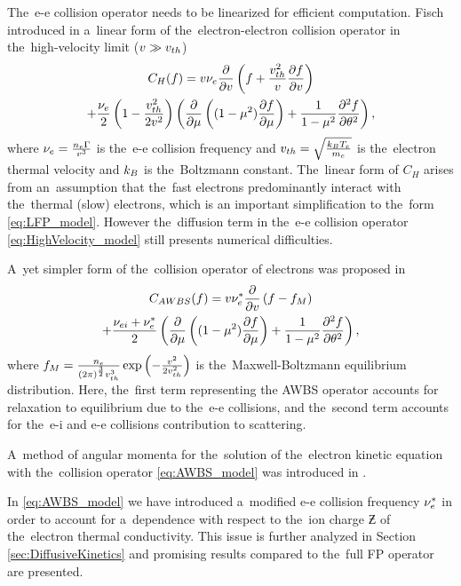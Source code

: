 The~e-e collision operator needs to be linearized for efficient computation.
Fisch introduced in \cite{Fisch_RMP1987} a~linear form of 
the~electron-electron collision operator  
in the~high-velocity limit ($v\gg v_{th}$)
\begin{multline}
  C_{H}(f) = v \nu_{e} \frac{\partial{}}{\partial{v}}\left(f + 
  \frac{v_{th}^2}{v}\frac{\partial{f}}{\partial{v}}\right) \\
  + \frac{\nu_{e}}{2}\left( 1 - \frac{v_{th}^2}{2v^2}\right) 
  \left(\frac{\partial{}}{\partial{\mu}}\left((1 - \mu^2)\frac{\partial{f}}{\partial{\mu}}\right)
  + \frac{1}{1-\mu^2}\frac{\partial^2f}{\partial\theta^2} \right)
  , \label{eq:HighVelocity_model}
\end{multline}
where $\nu_{e} = \frac{n_e \Gamma}{v^3}$ is the~e-e collision 
frequency and $v_{th} = \sqrt{\frac{k_B T_e}{m_e}}$ is the~electron thermal 
velocity and $k_B$ is the~Boltzmann constant.
The~linear form of $C_{H}$ arises from an~assumption that the~fast electrons 
predominantly interact with the~thermal (slow) electrons, 
which is an important simplification to the~form \eqref{eq:LFP_model}.
However the~diffusion term in the~e-e collision operator 
\eqref{eq:HighVelocity_model} still presents numerical difficulties.

A~yet simpler form of the~collision operator of electrons was proposed in 
\cite{Sorbo_2015}
\begin{multline}
  C_{AWBS}(f) = v \nu_{e}^*\frac{\partial{}}{\partial{v}}\left(f - f_M\right) \\
  + \frac{\nu_{ei} + \nu_{e}^*}{2} 
  \left(\frac{\partial{}}{\partial{\mu}}\left((1 - \mu^2)\frac{\partial{f}}{\partial{\mu}}\right)
  + \frac{1}{1-\mu^2}\frac{\partial^2f}{\partial\theta^2} \right)
  , \label{eq:AWBS_model}
\end{multline}
where $f_M = \frac{n_e}{(2\pi)^{\frac{3}{2}}v_{th}^3}
\exp\left(-\frac{v^2}{2v_{th}^2}\right)$ 
is the~Maxwell-Boltzmann equilibrium distribution.
Here, the~first term representing the AWBS operator \cite{AWBS_PRL1986}
accounts for relaxation to equilibrium due to the~e-e collisions, and 
the~second term accounts for the~e-i and e-e collisions contribution 
to scattering.

A~method of angular momenta for the~solution of the~electron kinetic equation
with the~collision operator \eqref{eq:AWBS_model} 
was introduced in \cite{Sorbo_2015, Sorbo_2016}. 

In \eqref{eq:AWBS_model} we have introduced a~modified e-e collision frequency
$\nu_{e}^*$ in order to account for a~dependence with respect to 
the~ion charge $\Zbar$ of the~electron thermal conductivity. This issue
is further analyzed in Section \ref{sec:DiffusiveKinetics} and promising 
results compared to the~full FP operator are presented.


